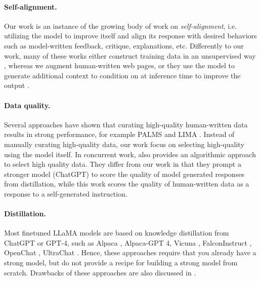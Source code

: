 \paragraph{Self-alignment.} Our work is  an instance of the growing body of work on \textit{self-alignment}, i.e. utilizing the model to improve itself and  align its response with desired behaviors such as model-written feedback, critique, explanations, etc. Differently to our work, many of these works either construct training data in an unsupervised way
\citep{sun2023principledriven,bai2022constitutional}, whereas we augment human-written web pages,
or they use the model to generate additional context to condition on at inference time to improve the output \citep{saunders2022self, zhang2023self,madaan2023self}.

\vspace{-2mm}

\paragraph{Data quality.}

Several approaches have shown that curating high-quality human-written data results in strong performance, for example PALMS \citep{solaiman2021process} and
LIMA \citep{zhou2023lima}. Instead of manually curating high-quality data, our work focus on selecting high-quality using the model itself. In concurrent work, \cite{chen2023alpagasus} also provides an algorithmic approach to select high quality data. They differ from our work in that they prompt a stronger model (ChatGPT) to score the quality of model generated responses from distillation, while this work scores the quality of human-written data as a response to a self-generated instruction. 



\paragraph{Distillation.} Most finetuned LLaMA models are based on knowledge distillation from ChatGPT or GPT-4, such as Alpaca \citep{alpaca}, Alpaca-GPT 4\citep{peng2023instruction}, Vicuna \citep{vicuna2023}, FalconInstruct \citep{falcon40b}, OpenChat \citep{openchat}, UltraChat \citep{ding2023enhancing}. 
Hence, these approaches require that you already have a strong model, but do not provide a recipe for building a strong model from scratch.
Drawbacks of these approaches are also discussed in \cite{gudibande2023false}.